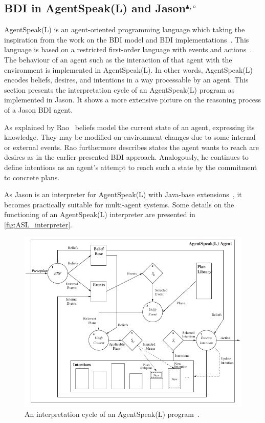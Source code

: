 \subsection[BDI in AgentSpeak(L) and Jason]{BDI in AgentSpeak(L) and Jason$^{\blacktriangle,\circ}$}
AgentSpeak(L) is an agent-oriented programming language which taking the inspiration from the work on the BDI model and BDI implementations~\cite{rafael_BDIAgent_2005}.
This language is based on a restricted first-order language with events and actions~\cite{anand_AgentSpeak_1996}.
The behaviour of an agent such as the interaction of that agent with the environment is implemented in AgentSpeak(L).
In other words, AgentSpeak(L) encodes beliefs, desires, and intentions in a way processable by an agent.
This section presents the interpretation cycle of an AgentSpeak(L) program as implemented in Jason.
It shows a more extensive picture on the reasoning process of a Jason BDI agent.

As explained by Rao~\cite{anand_AgentSpeak_1996} beliefs model the current state of an agent, expressing its knowledge.
They may be modified on environment changes due to some internal or external events.
Rao furthermore describes states the agent wants to reach are desires as in the earlier presented BDI approach.
Analogously, he continues to define intentions as an agent's attempt to reach such a state by the commitment to concrete plans.

As Jason is an interpreter for AgentSpeak(L) with Java-base extensions~\cite{rafael_Javabased}, it becomes practically suitable for multi-agent systems.
Some details on the functioning of an AgentSpeak(L) interpreter are presented in \autoref{fig:ASL_interpreter}.
\begin{figure}[h]
  \centering
  \includegraphics[width=\textwidth]{images/BDI_ASL_interpreter}
  \caption{An interpretation cycle of an AgentSpeak(L) program~\cite{rafael_BDIAgent_2005}.}
  \label{fig:ASL_interpreter}
\end{figure}

